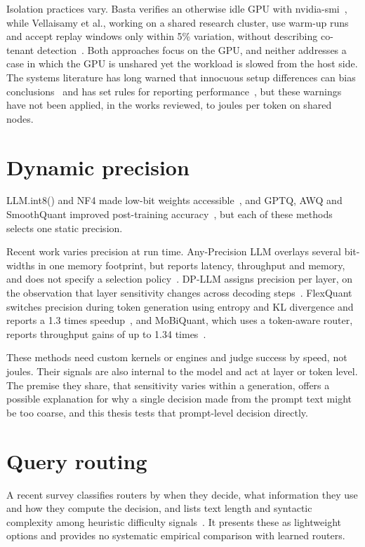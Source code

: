 Isolation practices vary. Basta verifies an otherwise idle GPU with nvidia-smi~\cite{b47}, while Vellaisamy et al., working on a shared research cluster, use warm-up runs and accept replay windows only within 5\% variation, without describing co-tenant detection~\cite{b8}. Both approaches focus on the GPU, and neither addresses a case in which the GPU is unshared yet the workload is slowed from the host side. The systems literature has long warned that innocuous setup differences can bias conclusions~\cite{b18} and has set rules for reporting performance~\cite{b19}, but these warnings have not been applied, in the works reviewed, to joules per token on shared nodes.

\section{Dynamic precision}
LLM.int8() and NF4 made low-bit weights accessible~\cite{b20,b21}, and GPTQ, AWQ and SmoothQuant improved post-training accuracy~\cite{b22,b23,b24}, but each of these methods selects one static precision.

Recent work varies precision at run time. Any-Precision LLM overlays several bit-widths in one memory footprint, but reports latency, throughput and memory, and does not specify a selection policy~\cite{b25}. DP-LLM assigns precision per layer, on the observation that layer sensitivity changes across decoding steps~\cite{b50}. FlexQuant switches precision during token generation using entropy and KL divergence and reports a 1.3 times speedup~\cite{b51}, and MoBiQuant, which uses a token-aware router, reports throughput gains of up to 1.34 times~\cite{b52}.

These methods need custom kernels or engines and judge success by speed, not joules. Their signals are also internal to the model and act at layer or token level. The premise they share, that sensitivity varies within a generation, offers a possible explanation for why a single decision made from the prompt text might be too coarse, and this thesis tests that prompt-level decision directly.

\section{Query routing}
A recent survey classifies routers by when they decide, what information they use and how they compute the decision, and lists text length and syntactic complexity among heuristic difficulty signals~\cite{b53}. It presents these as lightweight options and provides no systematic empirical comparison with learned routers.

